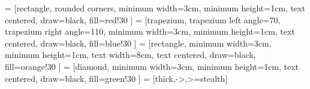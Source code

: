 \newcommand{\finishDocument}{
  \printBibliography
  \printGlossaryCustom
  \printAppendix
  \printDeclarationOfHonor
  \printTodos
}
\usetikzlibrary{shapes.geometric, arrows}
 = [rectangle,
                         rounded corners,
                         minimum width=3cm,
                         minimum height=1cm,
                         text centered,
                         draw=black,
                         fill=red!30
                        ]
 = [trapezium,
                  trapezium left angle=70,
                  trapezium right angle=110,
                  minimum width=3cm,
                  minimum height=1cm,
                  text centered,
                  draw=black,
                  fill=blue!30
                ]
 = [rectangle,
                       minimum width=3cm,
                       minimum height=1cm,
                       text width=8cm,
                       text centered,
                       draw=black,
                       fill=orange!30
                      ]
 = [diamond,
                        minimum width=3cm,
                        minimum height=1cm,
                        text centered,
                        draw=black,
                        fill=green!30
                      ]
 = [thick,->,>=stealth]                